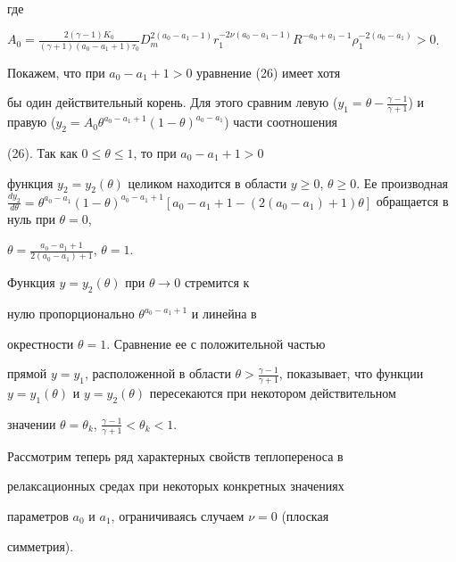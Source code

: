 где


$A_0=\frac{2(\gamma-1)K_0}{(\gamma+1)(a_0-a_1+1)\tau_0}


D_m^{2(a_0-a_1-1)}r_1^{-2\nu(a_0-a_1-1)}R^{-a_0+a_1-1}\rho_1^{-2(a_0-a_1)}>0$.





Покажем, что при $a_0 - a_1 + 1 > 0$ уравнение (26) имеет хотя


бы один действительный корень. Для этого сравним левую ($y_1 =


\theta - \frac {\gamma -1}{\gamma +1}$) и правую ($y_2 = A_0


\theta ^{a_0 - a_1 + 1}(1- \theta)^{a_0 - a_1}$) части соотношения


(26). Так как $0 \leq \theta \leq 1$, то при $a_0 - a_1 + 1 > 0$


функция $y_2 = y_2 (\theta) $ целиком находится в области $y \geq


0$, $\theta \geq 0$. Ее производная $\frac {dy_2}{d \theta} =


\theta ^{a_0 - a_1}(1- \theta)^{a_0 - a_1 + 1}[a_0 - a_1 + 1 -


(2(a_0 - a_1) + 1) \theta]$ обращается в нуль при $\theta = 0$,


$\theta = \frac {a_0 - a_1 + 1}{2(a_0 - a_1) + 1}$, $\theta = 1$.


Функция $y = y_2(\theta)$ при $\theta \rightarrow 0$ стремится к


нулю пропорционально $\theta ^{a_0 - a_1 + 1}$ и линейна в


окрестности $ \theta = 1$. Сравнение ее с положительной частью


прямой $y = y_1$, расположенной в области $\theta > \frac {\gamma


-1}{\gamma +1}$, показывает, что функции $y = y_1 (\theta)$ и $y =


y_2(\theta)$ пересекаются при некотором действительном


значении $\theta = \theta _k$, $\frac {\gamma - 1}{\gamma +1} <


\theta _k < 1$.





Рассмотрим теперь ряд характерных свойств теплопереноса в


релаксационных средах при некоторых конкретных значениях


параметров $a_0$ и $a_1$, ограничиваясь случаем $\nu = 0$ (плоская


симметрия).


